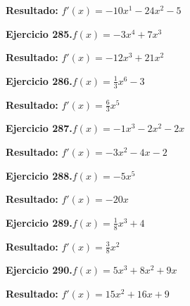 \documentclass[10pt,a4paper]{article}
\begin{document}
\begin{solbox}
\textbf{Resultado:} \(\displaystyle f'(x) = -10x^{1} -24x^{2} -5\)
\end{solbox}

\begin{ejbox}
\textbf{Ejercicio 285.}\quad $f(x) = -3x^{4} + 7x^{3}$
\end{ejbox}

\begin{solbox}
\textbf{Resultado:} \(\displaystyle f'(x) = -12x^{3} + 21x^{2}\)
\end{solbox}

\newpage
\begin{ejbox}
\textbf{Ejercicio 286.}\quad $f(x) = \frac{1}{3}x^{6} -3$
\end{ejbox}

\begin{solbox}
\textbf{Resultado:} \(\displaystyle f'(x) = \frac{6}{3}x^{5}\)
\end{solbox}

\begin{ejbox}
\textbf{Ejercicio 287.}\quad $f(x) = -1x^{3} -2x^2 -2x$
\end{ejbox}

\begin{solbox}
\textbf{Resultado:} \(\displaystyle f'(x) = -3x^{2} -4x -2\)
\end{solbox}

\begin{ejbox}
\textbf{Ejercicio 288.}\quad $f(x) = -5x^{5}$
\end{ejbox}

\begin{solbox}
\textbf{Resultado:} \(\displaystyle f'(x) = -20x\)
\end{solbox}

\newpage
\begin{ejbox}
\textbf{Ejercicio 289.}\quad $f(x) = \frac{1}{8}x^{3} +4$
\end{ejbox}

\begin{solbox}
\textbf{Resultado:} \(\displaystyle f'(x) = \frac{3}{8}x^{2}\)
\end{solbox}

\begin{ejbox}
\textbf{Ejercicio 290.}\quad $f(x) = 5x^{3} +8x^2 +9x$
\end{ejbox}

\begin{solbox}
\textbf{Resultado:} \(\displaystyle f'(x) = 15x^{2} +16x +9\)
\end{solbox}
\end{document}
